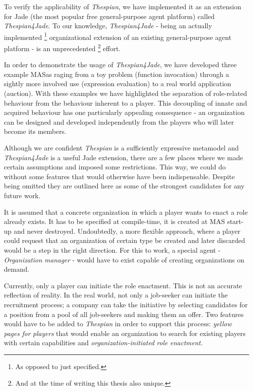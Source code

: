 To verify the applicability of \textit{Thespian}, we have implemented it as an extension for Jade (the most popular free general-purpose agent platform) called \textit{Thespian4Jade}.
To our knowledge, \textit{Thespian4Jade} - being an actually implemented
\footnote{As opposed to just specified.}
organizational extension of an existing general-purpose agent platform - is an unprecedented
\footnote{And at the time of writing this thesis also unique.}
effort.

In order to demonstrate the usage of \textit{Thespian4Jade}, we have developed three example MASas raging from a toy problem (function invocation) through a sightly more involved use (expression evaluation) to a real world application (auction).
With these examples we have highlighted the separation of role-related behaviour from the behaviour inherent to a player.
This decoupling of innate and acquired behaviour has one particularly appealing consequence - an organization can be designed and developed independently from the players who will later become its members. 


Although we are confident \textit{Thespian} is a sufficiently expressive metamodel and \textit{Thespian4Jade} is a useful Jade extension, there are a few places where we made certain assumptions and imposed some restrictions.
This way, we could do without some features that would otherwise have been indispensable.
Despite being omitted they are outlined here as some of the strongest candidates for any future work.

It is assumed that a concrete organization in which a player wants to enact a role already exists.
It has to be specified at compile-time, it is created at MAS start-up and never destroyed.
Undoubtedly, a more flexible approach, where a player could request that an organization of certain type be created and later discarded would be a step in the right direction.
For this to work, a special agent - \textit{Organization manager} - would have to exist capable of creating organizations on demand.

Currently, only a player can initiate the role enactment.
This is not an accurate reflection of reality.
In the real world, not only a job-seeker can initiate the recruitment process; a company can take the initiative by selecting candidates for a position from a pool of all job-seekers and making them an offer.
Two features would have to be added to \textit{Thespian} in order to support this process: \textit{yellow pages for players} that would enable an organization to search for existing players with certain capabilities and \textit{organization-initiated role enactment}.

